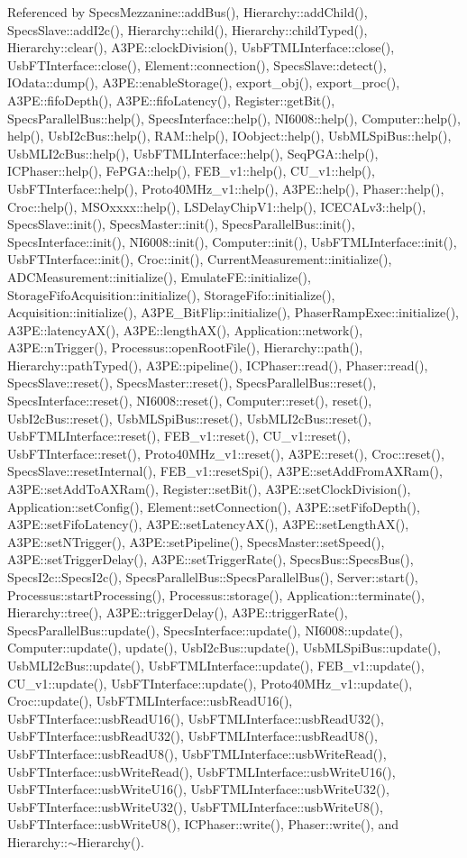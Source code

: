 Referenced by SpecsMezzanine::addBus(), Hierarchy::addChild(), SpecsSlave::addI2c(), Hierarchy::child(), Hierarchy::childTyped(), Hierarchy::clear(), A3PE::clockDivision(), UsbFTMLInterface::close(), UsbFTInterface::close(), Element::connection(), SpecsSlave::detect(), IOdata::dump(), A3PE::enableStorage(), export\_\-obj(), export\_\-proc(), A3PE::fifoDepth(), A3PE::fifoLatency(), Register::getBit(), SpecsParallelBus::help(), SpecsInterface::help(), NI6008::help(), Computer::help(), help(), UsbI2cBus::help(), RAM::help(), IOobject::help(), UsbMLSpiBus::help(), UsbMLI2cBus::help(), UsbFTMLInterface::help(), SeqPGA::help(), ICPhaser::help(), FePGA::help(), FEB\_\-v1::help(), CU\_\-v1::help(), UsbFTInterface::help(), Proto40MHz\_\-v1::help(), A3PE::help(), Phaser::help(), Croc::help(), MSOxxxx::help(), LSDelayChipV1::help(), ICECALv3::help(), SpecsSlave::init(), SpecsMaster::init(), SpecsParallelBus::init(), SpecsInterface::init(), NI6008::init(), Computer::init(), UsbFTMLInterface::init(), UsbFTInterface::init(), Croc::init(), CurrentMeasurement::initialize(), ADCMeasurement::initialize(), EmulateFE::initialize(), StorageFifoAcquisition::initialize(), StorageFifo::initialize(), Acquisition::initialize(), A3PE\_\-BitFlip::initialize(), PhaserRampExec::initialize(), A3PE::latencyAX(), A3PE::lengthAX(), Application::network(), A3PE::nTrigger(), Processus::openRootFile(), Hierarchy::path(), Hierarchy::pathTyped(), A3PE::pipeline(), ICPhaser::read(), Phaser::read(), SpecsSlave::reset(), SpecsMaster::reset(), SpecsParallelBus::reset(), SpecsInterface::reset(), NI6008::reset(), Computer::reset(), reset(), UsbI2cBus::reset(), UsbMLSpiBus::reset(), UsbMLI2cBus::reset(), UsbFTMLInterface::reset(), FEB\_\-v1::reset(), CU\_\-v1::reset(), UsbFTInterface::reset(), Proto40MHz\_\-v1::reset(), A3PE::reset(), Croc::reset(), SpecsSlave::resetInternal(), FEB\_\-v1::resetSpi(), A3PE::setAddFromAXRam(), A3PE::setAddToAXRam(), Register::setBit(), A3PE::setClockDivision(), Application::setConfig(), Element::setConnection(), A3PE::setFifoDepth(), A3PE::setFifoLatency(), A3PE::setLatencyAX(), A3PE::setLengthAX(), A3PE::setNTrigger(), A3PE::setPipeline(), SpecsMaster::setSpeed(), A3PE::setTriggerDelay(), A3PE::setTriggerRate(), SpecsBus::SpecsBus(), SpecsI2c::SpecsI2c(), SpecsParallelBus::SpecsParallelBus(), Server::start(), Processus::startProcessing(), Processus::storage(), Application::terminate(), Hierarchy::tree(), A3PE::triggerDelay(), A3PE::triggerRate(), SpecsParallelBus::update(), SpecsInterface::update(), NI6008::update(), Computer::update(), update(), UsbI2cBus::update(), UsbMLSpiBus::update(), UsbMLI2cBus::update(), UsbFTMLInterface::update(), FEB\_\-v1::update(), CU\_\-v1::update(), UsbFTInterface::update(), Proto40MHz\_\-v1::update(), Croc::update(), UsbFTMLInterface::usbReadU16(), UsbFTInterface::usbReadU16(), UsbFTMLInterface::usbReadU32(), UsbFTInterface::usbReadU32(), UsbFTMLInterface::usbReadU8(), UsbFTInterface::usbReadU8(), UsbFTMLInterface::usbWriteRead(), UsbFTInterface::usbWriteRead(), UsbFTMLInterface::usbWriteU16(), UsbFTInterface::usbWriteU16(), UsbFTMLInterface::usbWriteU32(), UsbFTInterface::usbWriteU32(), UsbFTMLInterface::usbWriteU8(), UsbFTInterface::usbWriteU8(), ICPhaser::write(), Phaser::write(), and Hierarchy::$\sim$Hierarchy().


